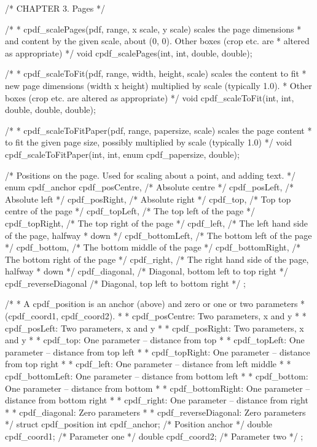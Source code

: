 /* CHAPTER 3. Pages */

/*
 * cpdf_scalePages(pdf, range, x scale, y scale) scales the page dimensions
 * and content by the given scale, about (0, 0). Other boxes (crop etc. are
 * altered as appropriate)
 */
void cpdf_scalePages(int, int, double, double);

/*
 * cpdf_scaleToFit(pdf, range, width, height, scale) scales the content to fit
 * new page dimensions (width x height) multiplied by scale (typically 1.0).
 * Other boxes (crop etc. are altered as appropriate)
 */
void cpdf_scaleToFit(int, int, double, double, double);

/*
 * cpdf_scaleToFitPaper(pdf, range, papersize, scale) scales the page content
 * to fit the given page size, possibly multiplied by scale (typically 1.0)
 */
void cpdf_scaleToFitPaper(int, int, enum cpdf_papersize, double);

/* Positions on the page. Used for scaling about a point, and adding text. */
enum cpdf_anchor {
  cpdf_posCentre,      /* Absolute centre */
  cpdf_posLeft,        /* Absolute left */
  cpdf_posRight,       /* Absolute right */
  cpdf_top,            /* Top top centre of the page */
  cpdf_topLeft,        /* The top left of the page */
  cpdf_topRight,       /* The top right of the page */
  cpdf_left,           /* The left hand side of the page, halfway
                        * down */
  cpdf_bottomLeft,     /* The bottom left of the page */
  cpdf_bottom,         /* The bottom middle of the page */
  cpdf_bottomRight,    /* The bottom right of the page */
  cpdf_right,          /* The right hand side of the page, halfway
                        * down */
  cpdf_diagonal,       /* Diagonal, bottom left to top right */
  cpdf_reverseDiagonal /* Diagonal, top left to bottom right */
};

/*
 * A cpdf_position is an anchor (above) and zero or one or two parameters
 * (cpdf_coord1, cpdf_coord2).
 *
 * cpdf_posCentre: Two parameters, x and y
 *
 * cpdf_posLeft: Two parameters, x and y
 *
 * cpdf_posRight: Two parameters, x and y
 *
 * cpdf_top: One parameter -- distance from top
 *
 * cpdf_topLeft: One parameter -- distance from top left
 *
 * cpdf_topRight: One parameter -- distance from top right
 *
 * cpdf_left: One parameter -- distance from left middle
 *
 * cpdf_bottomLeft: One parameter -- distance from bottom left
 *
 * cpdf_bottom: One parameter -- distance from bottom
 *
 * cpdf_bottomRight: One parameter -- distance from bottom right
 *
 * cpdf_right: One parameter -- distance from right
 *
 * cpdf_diagonal: Zero parameters
 *
 * cpdf_reverseDiagonal: Zero parameters
 */
struct cpdf_position {
  int cpdf_anchor;    /* Position anchor */
  double cpdf_coord1; /* Parameter one */
  double cpdf_coord2; /* Parameter two */
};

